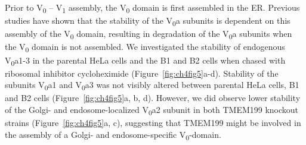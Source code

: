 Prior to V\textsubscript{0} – V\textsubscript{1} assembly, the V\textsubscript{0} domain is first assembled in the ER\cite{forgac_vacuolar_2007,esmail_n-linked_2016,esmail_n-linked_2017,ramachandran_vma21_2013}. Previous studies have shown that the stability of the V\textsubscript{0}a subunits is dependent on this assembly of the V\textsubscript{0} domain, resulting in degradation of the V\textsubscript{0}a subunits when the V\textsubscript{0} domain is not assembled\cite{esmail_n-linked_2016,esmail_n-linked_2017}. We investigated the stability of endogenous V\textsubscript{0}a1-3 in the parental HeLa cells and the B1 and B2 cells when chased with ribosomal inhibitor cycloheximide (Figure~\ref{fig:ch4fig5}a-d). Stability of the subunits V\textsubscript{0}a1 and V\textsubscript{0}a3 was not visibly altered between parental HeLa cells, B1 and B2 cells (Figure~\ref{fig:ch4fig5}a, b, d). However, we did observe lower stability of the Golgi- and endosome-localized V\textsubscript{0}a2 subunit in both TMEM199 knockout strains (Figure~\ref{fig:ch4fig5}a, c), suggesting that TMEM199 might be involved in the assembly of a Golgi- and endosome-specific V\textsubscript{0}-domain.

